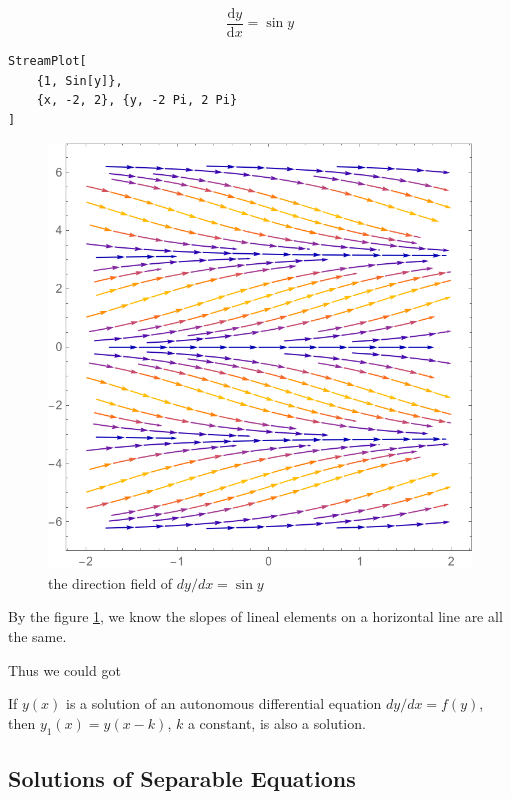 \documentclass{beaulivre}
\begin{document}
\begin{example}
    \[
        \dfrac{\mathrm{d}y}{\mathrm{d}x} = \sin y
    \]

    \begin{verbatim}
StreamPlot[
    {1, Sin[y]}, 
    {x, -2, 2}, {y, -2 Pi, 2 Pi}
]
    \end{verbatim}
    \begin{figure}[H]
        \centering
        \includegraphics[width = \textwidth]{figure/direction-field-dy-slash-dx-siny}
        \caption{the direction field of $dy/dx = \sin y$}
        \label{fig:direction-field-dy-slash-dx-siny}
    \end{figure}
\end{example}

By the figure \ref{fig:direction-field-dy-slash-dx-siny}, we know
the slopes of lineal elements on a horizontal line are all the same.

Thus we could got 
\begin{corollary}
    If $y(x)$ is a solution of an autonomous differential equation
    $dy/dx = f(y)$, then $y_1(x) = y(x - k)$, $k$ a constant,
    is also a solution.
\end{corollary}

\subsection{Solutions of Separable Equations}
\end{document}
